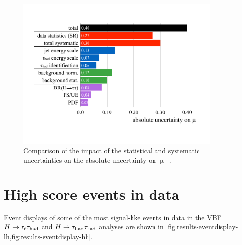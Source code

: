 \begin{figure}[tp]
  \centering
  \includegraphics[width=0.90\textwidth]{figures/HIGG-2013-32/uncertainties}
  \caption{Comparison of the impact of the statistical and systematic uncertainties on the absolute uncertainty on $\upmu$~\cite{HIGG-2013-32}.}
  \label{fig:results-uncertainties-1}
\end{figure}


\section{High score events in data}

Event displays of some of the most signal-like events in data in the VBF $H\rightarrow\tau_\ell\tau_\text{had}$ and $H\rightarrow\tau_\text{had}\tau_\text{had}$ analyses are shown in \cref{fig:results-eventdisplay-lh,fig:results-eventdisplay-hh}.

